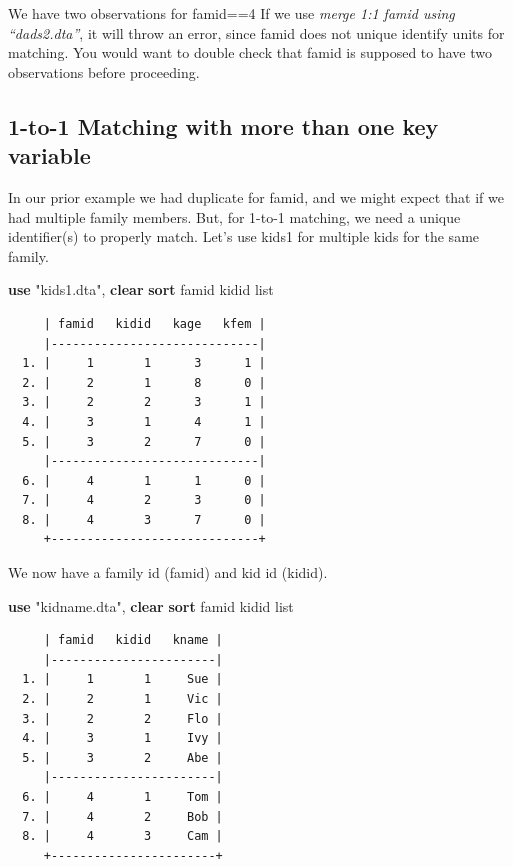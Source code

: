 \documentclass[
]{book}
\newenvironment{Shaded}{\begin{snugshade}}{\end{snugshade}}
\newcommand{\KeywordTok}[1]{\textcolor[rgb]{0.13,0.29,0.53}{\textbf{#1}}}
\newcommand{\NormalTok}[1]{#1}
\newcommand{\OtherTok}[1]{\textcolor[rgb]{0.56,0.35,0.01}{#1}}
\newcommand{\StringTok}[1]{\textcolor[rgb]{0.31,0.60,0.02}{#1}}
\begin{document}
We have two observations for famid==4
If we use \emph{merge 1:1 famid using ``dads2.dta''}, it will throw an error, since famid does not unique identify units for matching. You would want to double check that famid is supposed to have two observations before proceeding.

\subsection{1-to-1 Matching with more than one key variable}\label{to-1-matching-with-more-than-one-key-variable}

In our prior example we had duplicate for famid, and we might expect that if we had multiple family members. But, for 1-to-1 matching, we need a unique identifier(s) to properly match.
Let's use kids1 for multiple kids for the same family.

\begin{Shaded}
\begin{Highlighting}[]
\KeywordTok{use} \StringTok{"kids1.dta"}\NormalTok{, }\KeywordTok{clear}
\KeywordTok{sort}\NormalTok{ famid kidid}
\OtherTok{list}
\end{Highlighting}
\end{Shaded}

\begin{verbatim}
     | famid   kidid   kage   kfem |
     |-----------------------------|
  1. |     1       1      3      1 |
  2. |     2       1      8      0 |
  3. |     2       2      3      1 |
  4. |     3       1      4      1 |
  5. |     3       2      7      0 |
     |-----------------------------|
  6. |     4       1      1      0 |
  7. |     4       2      3      0 |
  8. |     4       3      7      0 |
     +-----------------------------+
\end{verbatim}

We now have a family id (famid) and kid id (kidid).

\begin{Shaded}
\begin{Highlighting}[]
\KeywordTok{use} \StringTok{"kidname.dta"}\NormalTok{, }\KeywordTok{clear}
\KeywordTok{sort}\NormalTok{ famid kidid}
\OtherTok{list}
\end{Highlighting}
\end{Shaded}

\begin{verbatim}
     | famid   kidid   kname |
     |-----------------------|
  1. |     1       1     Sue |
  2. |     2       1     Vic |
  3. |     2       2     Flo |
  4. |     3       1     Ivy |
  5. |     3       2     Abe |
     |-----------------------|
  6. |     4       1     Tom |
  7. |     4       2     Bob |
  8. |     4       3     Cam |
     +-----------------------+
\end{verbatim}
\end{document}
